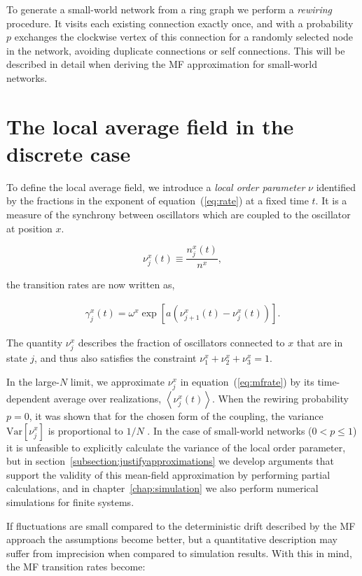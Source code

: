 To generate a small-world network from a ring graph we perform a \textit{rewiring} procedure. It visits each existing connection
exactly once, and with a probability $p$ exchanges the clockwise vertex of this connection for a randomly selected node in the network,
avoiding duplicate connections or self connections. This will be described in detail when deriving the MF approximation for small-world
networks.

\section{The local average field in the discrete case}

To define the local average field, we introduce a \textit{local order parameter} $\nu$ identified by the fractions in the exponent of
equation~(\ref{eq:rate}) at a fixed time $t$. It is a measure of the synchrony between oscillators which are coupled to the
oscillator at position $x$.

\begin{equation}
  \nu^x_j(t) \equiv \frac{n^x_j(t)}{n^x},
\end{equation}

\noindent the transition rates are now written as,

\begin{align}
  \gamma^x_j(t) = \omega^x\exp\left[ a(\nu^x_{j+1}(t) - \nu^x_j(t)) \right].
  \label{eq:mfrate}
\end{align}

The quantity $\nu^x_j$ describes the fraction of oscillators connected to $x$ that are in state $j$, and thus also satisfies the
constraint $\nu^x_1+\nu^x_2+\nu^x_3=1$.

In the large-$N$ limit, we approximate $\nu^x_j$ in equation~(\ref{eq:mfrate}) by its time-dependent average over realizations, $\left<
\nu^x_j(t) \right>$. When the rewiring probability $p=0$, it was shown that for the chosen form of the coupling, the variance
$\text{Var}[\nu^x_j]$ is proportional to $1/N$ \cite{escaff2014arrays}. In the case of small-world networks ($0<p \leq 1$) it is
unfeasible to explicitly calculate the variance of the local order parameter, but in section~\ref{subsection:justifyapproximations} we
develop arguments that support the validity of this mean-field approximation by performing partial calculations, and in
chapter~\ref{chap:simulation} we also perform numerical simulations for finite systems.

If fluctuations are small compared to the deterministic drift described by the MF approach the assumptions become better, but a
quantitative description may suffer from imprecision when compared to simulation results. With this in mind, the MF transition rates
become:

